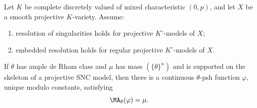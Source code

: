 \begin{theorem}\label{thm:fgk-mixed-characteristic-cy}
Let \(K\) be complete discretely valued of mixed characteristic \((0,p)\),
and let \(X\) be a smooth projective \(K\)-variety.  Assume:
\begin{enumerate}
\item resolution of singularities holds for projective
      \(K^\circ\)-models of \(X\);
\item embedded resolution holds for regular projective
      \(K^\circ\)-models of \(X\).
\end{enumerate}
If \(\theta\) has ample de Rham class and \(\mu\) has mass
\((\{\theta\}^n)\) and is supported on the skeleton of a projective SNC
model, then there is a continuous \(\theta\)-psh function \(\varphi\),
unique modulo constants, satisfying
\[
                         \MA_\theta(\varphi)=\mu.
\]
\end{theorem}

